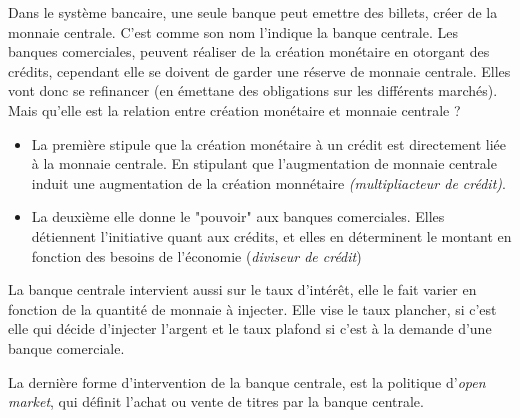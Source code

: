 Dans le système bancaire, une seule banque peut emettre des billets, créer de la monnaie centrale. C'est comme son nom l'indique la banque centrale. 
Les banques comerciales, peuvent réaliser de la création monétaire en otorgant des crédits, cependant elle se doivent de garder une réserve de monnaie
centrale. Elles vont donc se refinancer (en émettane des obligations sur les différents marchés). Mais qu'elle est la relation entre création monétaire
et monnaie centrale ? 
\begin{itemize}
	\item La première stipule que la création monétaire à un crédit est directement liée à la monnaie centrale. En stipulant que l'augmentation de monnaie centrale induit une augmentation de la création monnétaire \emph{(multipliacteur de crédit)}.
	\item La deuxième elle donne le "pouvoir" aux banques comerciales. Elles détiennent l'initiative quant aux crédits, et elles en déterminent le montant
	en fonction des besoins de l'économie (\emph{diviseur de crédit}) 
\end{itemize}

La banque centrale intervient aussi sur le taux d'intérêt, elle le fait varier en fonction de la quantité de monnaie à injecter. Elle vise le taux plancher, 
si c'est elle qui décide d'injecter l'argent et le taux plafond si c'est à la demande d'une banque comerciale. 

La dernière forme d'intervention de la banque centrale, est la politique d'\emph{open market}, qui définit l'achat ou vente de titres par la banque centrale.




